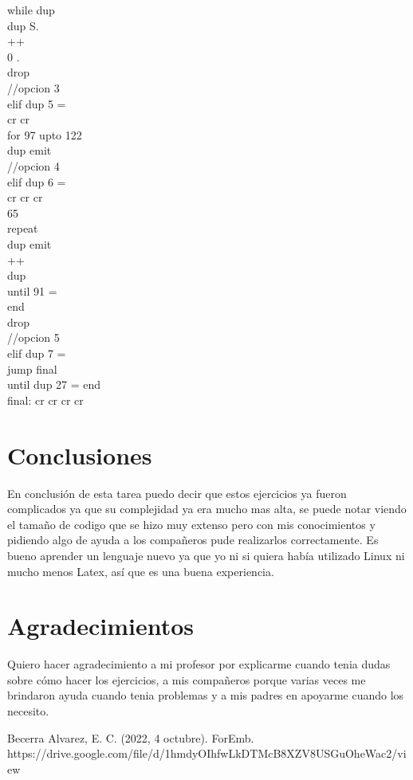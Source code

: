 \documentclass[conference]{IEEEtran}
\begin{document}
\begin{enumerate}
\begin{center}
while dup \\  dup S. \\ ++ \\ 0 . \\ drop \\ //opcion 3 \\ elif dup 5 = \\ cr cr \\ for 97 upto 122 \\ dup emit \\ //opcion 4 \\ elif dup 6 = \\ cr cr cr \\ 65 \\ repeat \\ dup emit \\ ++ \\ dup \\ until 91 = \\  end \\ drop \\ //opcion 5 \\ elif dup 7 = \\ jump final \\ until dup 27 = end \\ final: cr cr cr cr 
	\end{center}
\end{enumerate}

\section{Conclusiones}  
En conclusión de esta tarea puedo decir que estos ejercicios ya fueron complicados ya que su complejidad ya era mucho mas alta, se puede notar viendo el tamaño de codigo que se hizo muy extenso pero con mis conocimientos y pidiendo algo de ayuda a los compañeros pude realizarlos correctamente. Es bueno aprender un lenguaje nuevo ya que yo ni si quiera había utilizado Linux ni mucho menos Latex, así que es una buena experiencia.

\section*{Agradecimientos}
Quiero hacer agradecimiento a mi profesor por explicarme cuando tenia dudas sobre cómo hacer los ejercicios, a mis compañeros porque varias veces me brindaron ayuda cuando tenia problemas y a mis padres en apoyarme cuando los necesito.

\begin{thebibliography}{00}
 Becerra Alvarez, E. C. (2022, 4 octubre). ForEmb. https://drive.google.com/file/d/1hmdyOIhfwLkDTMcB8XZV8USGuOheWac2/view
\end{thebibliography}
\end{document}
